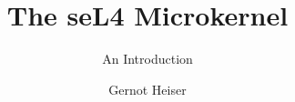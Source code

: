 \documentclass[english,a4paper,12pt]{report}
\begin{document}
\raggedright

  \renewcommand{\chapterautorefname}{Chapter}
  \renewcommand{\sectionautorefname}{Section}
  \renewcommand{\subsectionautorefname}{Section}
  \renewcommand{\subsubsectionautorefname}{Section}
  \renewcommand{\appendixautorefname}{Appendix}
  \renewcommand{\Hfootnoteautorefname}{Footnote}
  \newcommand{\Htextbf}[1]{\textbf{\hyperpage{#1}}}

  \renewcommand{\topfraction}{0.9}
  \renewcommand{\bottomfraction}{0.9}

  \title{The seL4 Microkernel}
  \subtitle{An Introduction}

  \author{Gernot Heiser}
  \date{}

  \thispagestyle{plain}
  \maketitle
  \doCopyright[2020]
\end{document}

